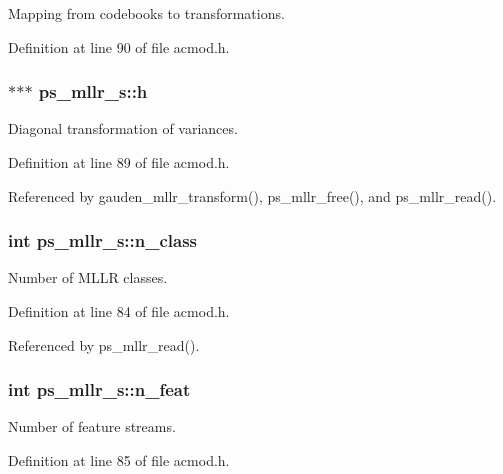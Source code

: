 \-Mapping from codebooks to transformations. 



\-Definition at line 90 of file acmod.\-h.

\subsubsection[{h}]{$\ast$$\ast$$\ast$ {\bf ps\-\_\-mllr\-\_\-s\-::h}}\label{structps__mllr__s_ae92b910e17202389aca99ee5105085b0}


\-Diagonal transformation of variances. 



\-Definition at line 89 of file acmod.\-h.



\-Referenced by gauden\-\_\-mllr\-\_\-transform(), ps\-\_\-mllr\-\_\-free(), and ps\-\_\-mllr\-\_\-read().

\subsubsection[{n\-\_\-class}]{\setlength{\rightskip}{0pt plus 5cm}int {\bf ps\-\_\-mllr\-\_\-s\-::n\-\_\-class}}\label{structps__mllr__s_a30b9bb76c5469542d531ead4ad1bdcb1}


\-Number of \-M\-L\-L\-R classes. 



\-Definition at line 84 of file acmod.\-h.



\-Referenced by ps\-\_\-mllr\-\_\-read().

\subsubsection[{n\-\_\-feat}]{\setlength{\rightskip}{0pt plus 5cm}int {\bf ps\-\_\-mllr\-\_\-s\-::n\-\_\-feat}}\label{structps__mllr__s_acc9e853a333f4e79b24f3e5af0946e43}


\-Number of feature streams. 



\-Definition at line 85 of file acmod.\-h.



